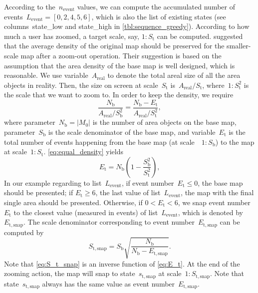 \documentclass[ijgi,article,submit,moreauthors,pdftex]{Definitions/mdpi}
\begin{document}
According to the~$n_\mathrm{event}$ values,
we can compute the accumulated number of events~$L_\mathrm{event} = 
[0, 2, 4, 5, 6]$,
which is also the list of existing states
(see columns~state\_low and state\_high in \tbl\ref{tbl:sequence_greedy}).
According to how much a user has zoomed,
a target scale, say, $1:S_\mathrm{t}$ can be computed.
\citet{Huang2016Webmap} suggested that 
the average density of the original map should be preserved 
for the smaller-scale map after a zoom-out operation.
Their suggestion is based on the assumption that 
the area density of the base map is well designed, which is reasonable.
We use variable~$A_\mathrm{real}$ to denote the total areal size of 
all the area objects in reality.
Then, the size on screen at scale~$S_\mathrm{t}$ 
is~$A_\mathrm{real} \big/ S_\mathrm{t}$,
where~$1:S^2_\mathrm{t}$ is the scale that we want to zoom to.
In order to keep the density, we require
\begin{equation}
\label{eq:equal_density}
\frac{N_\mathrm{b}}{A_\mathrm{real} \big/ S^2_\mathrm{b}} =
\frac{N_\mathrm{b}-E_\mathrm{t}}{A_\mathrm{real} \big/ S^2_\mathrm{t}},
\end{equation}
where parameter~$N_\mathrm{b} = |M_0|$ is the number of area objects on the base map,
parameter~$S_\mathrm{b}$ is the scale denominator of the base map,
and variable~$E_\mathrm{t}$ is the total number of events 
happening from the base map (at scale~~$1:S_\mathrm{b}$) 
to the map at scale~$1:S_\mathrm{t}$.
\eq\ref{eq:equal_density} yields
\begin{equation}
\label{eq:E_t}
E_\mathrm{t} = N_\mathrm{b} \left(1-\frac{S^2_\mathrm{b}}{S^2_\mathrm{t}}\right),
\end{equation}
In our example regarding to list~$L_\mathrm{event}$,
if event number~$E_\mathrm{t} \le 0$, the base map should be presented;
if $E_\mathrm{t} \ge 6$, the last value of list~$L_\mathrm{event}$,
the map with the final single area should be presented.
Otherwise, if $0<E_\mathrm{t} < 6$, we snap event number~$E_\mathrm{t}$ 
to the closest value (measured in events) of list~$L_\mathrm{event}$,
which is denoted by~$E_\mathrm{t,snap}$.
The scale denominator corresponding to event number~$E_\mathrm{t,snap}$
can be computed by 
\begin{equation}
\label{eq:S_t_snap}
S_\mathrm{t,snap} = S_\mathrm{b} \sqrt{\frac{N_\mathrm{b}}{N_\mathrm{b}-E_\mathrm{t,snap}}}.
\end{equation}
Note that \eq\ref{eq:S_t_snap} is an inverse function of \eq\ref{eq:E_t}.
At the end of the zooming action, 
the map will snap to state~$s_\mathrm{t,snap}$
at scale~$1:S_\mathrm{t,snap}$.
Note that state~$s_\mathrm{t,snap}$ always has 
the same value as event number~$E_\mathrm{t,snap}$.
\end{document}
